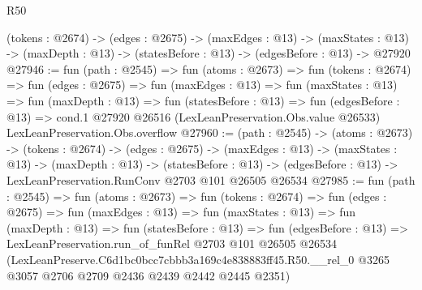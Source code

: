 \begin{lexlean}{R50}
\begin{coremodule}
  (tokens : @2674) ->
  (edges : @2675) ->
  (maxEdges : @13) ->
  (maxStates : @13) -> (maxDepth : @13) -> (statesBefore : @13) -> (edgesBefore : @13) -> @27920
@27946 := fun (path : @2545) =>
  fun (atoms : @2673) =>
  fun (tokens : @2674) =>
  fun (edges : @2675) =>
  fun (maxEdges : @13) =>
  fun (maxStates : @13) =>
  fun (maxDepth : @13) =>
  fun (statesBefore : @13) =>
  fun (edgesBefore : @13) =>
  cond.{1} @27920 @26516 (LexLeanPreservation.Obs.value @26533) LexLeanPreservation.Obs.overflow
@27960 := (path : @2545) ->
  (atoms : @2673) ->
  (tokens : @2674) ->
  (edges : @2675) ->
  (maxEdges : @13) ->
  (maxStates : @13) ->
  (maxDepth : @13) ->
  (statesBefore : @13) ->
  (edgesBefore : @13) -> LexLeanPreservation.RunConv @2703 @101 @26505 @26534
@27985 := fun (path : @2545) =>
  fun (atoms : @2673) =>
  fun (tokens : @2674) =>
  fun (edges : @2675) =>
  fun (maxEdges : @13) =>
  fun (maxStates : @13) =>
  fun (maxDepth : @13) =>
  fun (statesBefore : @13) =>
  fun (edgesBefore : @13) =>
  LexLeanPreservation.run_of_funRel
    @2703
    @101
    @26505
    @26534
    (LexLeanPreserve.C6d1bc0bcc7cbbb3a169c4e838883ff45.R50.__rel_0
      @3265
      @3057
      @2706
      @2709
      @2436
      @2439
      @2442
      @2445
      @2351)
\end{coremodule}
\end{lexlean}
